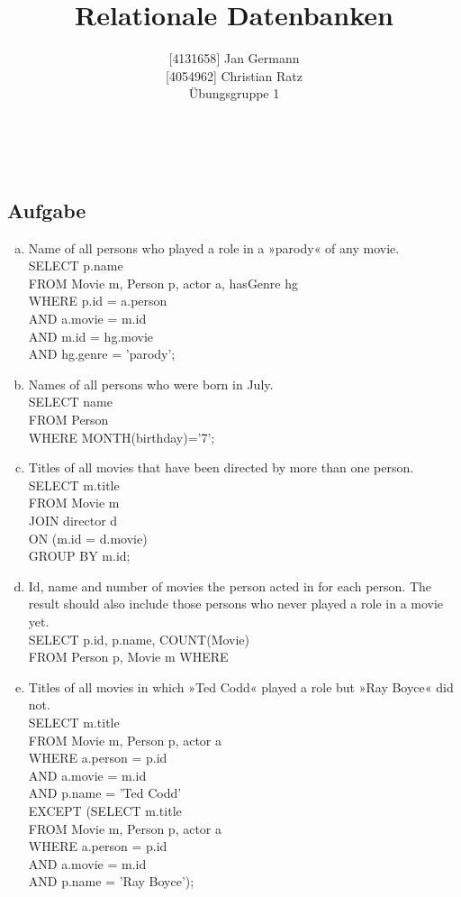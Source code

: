 \documentclass[11pt,a4paper,DIV=9]{scrartcl}
\author{{[}4131658{]} Jan Germann \\{[}4054962{]} Christian Ratz\\Übungsgruppe 1}
\title{Relationale Datenbanken}
\newcounter{temp}
\newcommand{\aufgabe}[1]{
  \setcounter{temp}{\value{subsection}}
  \setcounter{subsection}{#1}
  \addtocounter{subsection}{-1}
  \subsection{Aufgabe}
  \setcounter{subsection}{\value{temp}}
}
\renewcommand{\author}[1]{\renewcommand{\author}{#1}}
\renewcommand{\title}[1]{\renewcommand{\title}{#1}}
\newcommand{\makehomeworktitle}{
  \begin{minipage}[t]{6.5cm}
    \sf{\author}
  \end{minipage}
  \begin{minipage}[t]{6.5cm}
    \begin{flushright}
      \sf{\title\\\today}
    \end{flushright}
  \end{minipage}
  \\[0.2cm]
  \begin{center}
    \sf{
      \color{blue}{
        \LARGE{Aufgabenblatt \blattnr}
      }
    }
  \end{center}
  \vspace{0.1cm}
}
\begin{document}
\makehomeworktitle
\aufgabe{1}
  \begin{enumerate}[a.]
      \item Name of all persons who played a role in a »parody« of any movie.\hfill\\
      SELECT p.name \\
      FROM Movie m, Person p, actor a, hasGenre hg \\
      WHERE p.id = a.person \\
      AND a.movie = m.id \\
      AND m.id = hg.movie \\
      AND hg.genre = 'parody';

      \item Names of all persons who were born in July.\hfill\\
      SELECT name \\
      FROM Person \\
      WHERE MONTH(birthday)='7';
      	
      \item Titles of all movies that have been directed by more than one person.\hfill\\ %
      SELECT m.title \\
      FROM Movie m \\
      JOIN director d \\
      ON (m.id = d.movie) \\
      GROUP BY m.id; \\

      \item Id, name and number of movies the person acted in for each person. The result should also include those persons who never played a role in a movie yet.\hfill\\ %
      SELECT p.id, p.name, COUNT(Movie) \\
      FROM Person p, Movie m
      WHERE

      \item Titles of all movies in which »Ted Codd« played a role but »Ray Boyce« did not.\hfill\\
      SELECT m.title \\
      FROM Movie m, Person p, actor a \\ 
      WHERE a.person = p.id \\
      AND a.movie = m.id \\
      AND p.name = 'Ted Codd' \\
      EXCEPT (SELECT m.title \\
      FROM Movie m, Person p, actor a \\
      WHERE a.person = p.id \\
      AND a.movie = m.id \\
      AND p.name = 'Ray Boyce');


\end{enumerate}
\end{document}
